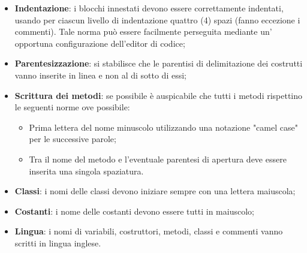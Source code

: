 \begin{itemize}
  \item \textbf{Indentazione}: i blocchi innestati devono essere correttamente indentati, usando per ciascun livello di indentazione quattro (4) spazi (fanno eccezione i commenti).  Tale norma può essere facilmente perseguita mediante un' opportuna configurazione dell'editor di codice;
  \item \textbf{Parentesizzazione}: si stabilisce che le parentisi di delimitazione dei costrutti vanno inserite in linea e non al di sotto di essi;
  \item \textbf{Scrittura dei metodi}: se possibile è auspicabile che tutti i metodi rispettino le seguenti norme ove possibile:
        \begin{itemize}
          \item Prima lettera del nome minuscolo utilizzando una notazione "camel case" per le successive parole;
          \item Tra il nome del metodo e l'eventuale parentesi di apertura deve essere inserita una singola spaziatura.
        \end{itemize}
  \item \textbf{Classi}: i nomi delle classi devono iniziare sempre con una lettera maiuscola;
  \item \textbf{Costanti}: i nome delle costanti devono essere tutti in maiuscolo;
  \item \textbf{Lingua}: i nomi di variabili, costruttori, metodi, classi e commenti vanno scritti in lingua inglese.
\end{itemize}












